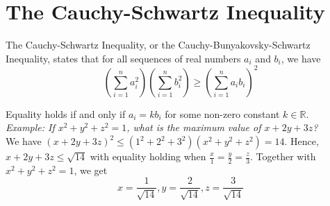 \section{The Cauchy-Schwartz Inequality}

    The Cauchy-Schwartz Inequality, or the Cauchy-Bunyakovsky-Schwartz Inequality, states
    that for all sequences of real numbers $a_i$ and $b_i$, we have \\

    \begin{equation*}
        (\sum^n_{i=1}a_i^2)
        (\sum^n_{i=1}b_i^2)
        \geq
        (\sum^n_{i=1}a_ib_i)^2
    \end{equation*}

    \noindent Equality holds if and only if $a_i=kb_i$ for some non-zero constant
    $k\in\mathbb{R}$. \\

    \noindent \color{blue} \textit{Example: If $x^2+y^2+z^2=1$, what is the maximum
    value of $x+2y+3z$?} \color{black} \\

    \noindent We have $(x+2y+3z)^2\leq(1^2+2^2+3^2)(x^2+y^2+z^2)=14$. Hence, $x+2y+3z\leq\sqrt{14}$
    with equality holding when $\frac{x}{1}=\frac{y}{2}=\frac{z}{3}$. Together with
    $x^2+y^2+z^2=1$, we get \\

    \begin{equation*}
        x=\frac{1}{\sqrt{14}},
        y=\frac{2}{\sqrt{14}},
        z=\frac{3}{\sqrt{14}}
    \end{equation*}